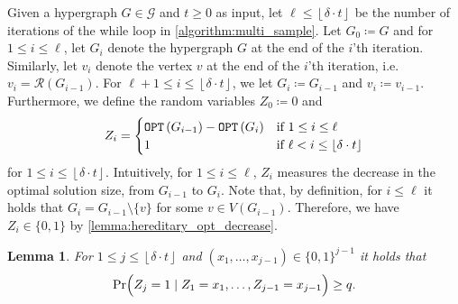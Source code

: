 \documentclass[letterpaper,11pt]{article}
\newcommand{\floor}[1]{ {\left\lfloor #1 \right\rfloor}}
\newcommand{\1}[1]{\mathds{1}\left[#1\right]}
\newcommand{\OPT}{\textnormal{\texttt{OPT}}}
\newtheorem{lemma}[theorem]{Lemma}
\begin{document}
Given a hypergraph $G \in
\mathcal{G}$ and $t \geq 0$ as input, let $\ell \leq \floor{\delta \cdot t}$ be
the number of iterations of the while loop in
\cref{algorithm:multi_sample}. Let $G_0 \coloneqq G$ and for $1 \leq i
\leq \ell$, let $G_i$ denote the hypergraph $G$ at the end
of the $i$'th iteration. Similarly, let $v_i$ denote the vertex $v$ at
the end of the $i$'th iteration, i.e. $v_i = \mathcal{R}\left( G_{i -1}
\right)$. For $\ell + 1 \leq i \leq \floor{\delta \cdot t}$, we let
$G_i \coloneqq G_{i - 1}$ and $v_i \coloneqq v_{i - 1}$.
Furthermore, we define the random variables $Z_0 \coloneqq 0$ and
\begin{equation*}
	Z_i = \begin{cases}
		\OPT\left( G_{i - 1} \right) - \OPT\left( G_i \right) &\text{if } 1 \leq i \leq \ell\\
		1 & \text{if } \ell < i \leq \floor{\delta \cdot t}
	\end{cases}
\end{equation*}
for $1 \leq i \leq \floor{\delta \cdot t}$.
Intuitively, for $1 \leq i \leq \ell$, $Z_i$ measures the decrease in
the optimal solution size, from $G_{i - 1}$ to $G_i$. Note that, by
definition, for $i \leq \ell$ it holds that $G_i = G_{i - 1} \setminus
\{v\}$ for some $v \in V\left( G_{i - 1} \right)$.
Therefore, we have $Z_i \in \{0,1\}$ by
\cref{lemma:hereditary_opt_decrease}.

\begin{lemma}\label{lemma:pr_Z_j_ind}
	For $1 \leq j \leq \floor{\delta \cdot t}$ and $(x_1, \ldots, x_{j -1}) \in \{0,1\}^{j-1}$ it holds that
	\begin{equation*}
		\Pr\Bigl( Z_j = 1 \mid Z_1 = x_1, \ldots, Z_{j- 1}  = x_{j- 1}\Bigr) \geq q.
	\end{equation*}
\end{lemma}
\end{document}
